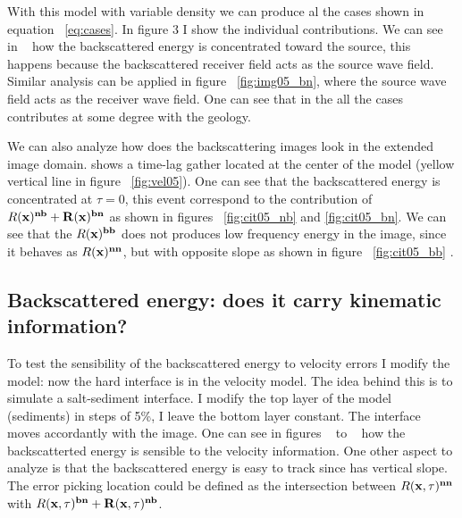 With this model with variable density we can produce al the cases shown in equation ~\ref{eq:cases}.  In figure 3 I show the individual
contributions. We can see in ~ how the backscattered energy is concentrated toward the source, this happens because
the backscattered receiver field acts as the source wave field. Similar analysis can be applied in figure ~\ref{fig:img05_bn}, where
the source wave field acts as the receiver wave field. One can see that in the all the cases contributes at some degree with the geology.

We can also analyze how does the backscattering images look in the extended image domain.  shows a time-lag
gather located at the center of the model (yellow vertical line in figure ~\ref{fig:vel05}). One can see that the backscattered energy 
is concentrated at $\tau=0$, this event correspond to the contribution of $R(\bf{x})^{nb} + R(\bf{x})^{bn}$ as shown in figures ~\ref{fig:cit05_nb}
and \ref{fig:cit05_bn}. We can see that the $R(\bf{x})^{bb}$ does not produces low frequency energy in the image, since it behaves as $R(\bf{x})^{nn}$, but
with opposite slope as shown in figure ~\ref{fig:cit05_bb} .


\subsection{Backscattered energy: does it carry kinematic information?}

To test the sensibility of the backscattered energy to velocity errors I modify the model: now the hard interface is in the velocity model. The idea
behind this is to simulate a salt-sediment interface. I modify the top layer of the model (sediments) in steps of 5\%, I leave the bottom layer constant. The interface
moves accordantly with the image.  One can see in figures ~ to ~  how the backscatterted energy is sensible to the velocity information. One other
aspect to analyze is that the backscattered energy is easy to track since has vertical slope. The error picking location could be defined as the intersection between
$R(\bf{x},\tau)^{nn}$ with $R(\bf{x},\tau)^{bn} +R(\bf{x},\tau)^{nb}$.





